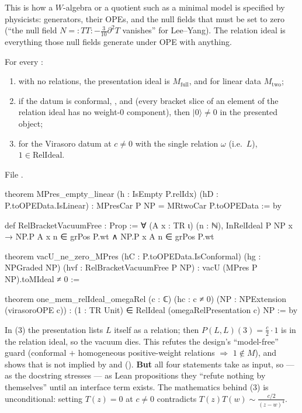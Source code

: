 \begin{physics}
This is how a $W$-algebra or a quotient such as a minimal model is specified by physicists: generators, their OPEs, and the null
fields that must be set to zero (``the null field $N = {:}TT{:}-\frac3{10}\partial^2T$ vanishes'' for Lee--Yang). The relation ideal is
everything those null fields generate under OPE with anything.
\end{physics}

\begin{theorem}\label{l11:thm:vapres}
For every :
\begin{enumerate}
\item with no relations, the presentation ideal is $M_{\mathrm{full}}$, and for linear data $M_{\mathrm{two}}$;
\item if the datum is conformal, , and  (every bracket slice of an element of the relation
  ideal has no weight-$0$ component), then $|0\rangle\neq0$ in the presented object;
\item for the Virasoro datum at $c\neq0$ with the single relation $\omega$ (i.e.\ $L$), $1\in\mathrm{RelIdeal}$.
\end{enumerate}
\end{theorem}
\noindent File .
\begin{leancode}
theorem MPres_empty_linear (h : IsEmpty P.relIdx) (hD : P.toOPEData.IsLinear) :
    MPresCar P NP = MRtwoCar P.toOPEData := by

def RelBracketVacuumFree : Prop :=
  ∀ (A x : TR ι) (n : ℕ), InRelIdeal P NP x →
    NP.P A x n ∈ grPos P.wt ∧ NP.P x A n ∈ grPos P.wt

theorem vacU_ne_zero_MPres (hC : P.toOPEData.IsConformal) (hg : NPGraded NP)
    (hvf : RelBracketVacuumFree P NP) : vacU (MPres P NP).toMIdeal ≠ 0 :=

theorem one_mem_relIdeal_omegaRel (c : ℂ) (hc : c ≠ 0)
    (NP : NPExtension (virasoroOPE c)) :
    (1 : TR Unit) ∈ RelIdeal (omegaRelPresentation c) NP := by
\end{leancode}

\begin{dictionary}
In (3) the presentation  lists $L$ itself as a relation; then $P(L,L)(3) = \frac c2\cdot1$ is in the
relation ideal, so the vacuum dies. This refutes the design's ``model-free'' guard (conformal $+$ homogeneous positive-weight
relations $\Rightarrow$ $1\notin M$), and shows that  is not implied by  and 
(\allowbreak{}\allowbreak{}). \textbf{But} all four statements take  as input, so --- as the docstring stresses
--- as Lean propositions they ``refute nothing by themselves'' until an interface term exists. The mathematics behind (3) is
unconditional: setting $T(z) = 0$ at $c\neq0$ contradicts $T(z)T(w)\sim\frac{c/2}{(z-w)^4}$.
\end{dictionary}

